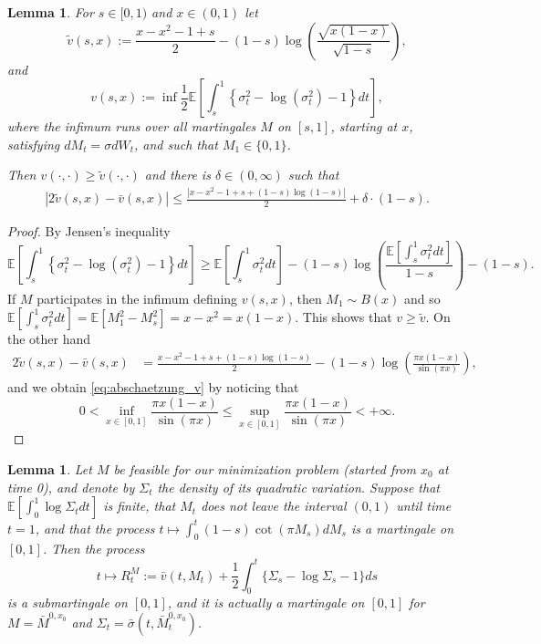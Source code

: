 \documentclass[reqno, a4paper]{amsart}
\newtheorem{lemma}[theorem]{Lemma}
\theoremstyle{remark}
\newcommand{\1}{\mathbbm 1}
\numberwithin{equation}{section}
\numberwithin{theorem}{section}
\newcommand{\mo}{\bar{M}}
\newcommand{\vo}{\bar{v}}
\newcommand{\so}{\bar{\sigma}}
\begin{document}
\begin{lemma}\label{lem:various_vs}
	For $s\in[0,1)$ and $x\in(0,1)$ let 
	\[\tilde v(s,x):= \frac{x-x^2-1+s}{2}-(1-s)\log\left(\frac{\sqrt{x(1-x)}}{\sqrt{1-s}} \right ),\]
	and
	\[v(s,x):=\inf\frac{1}{2}\mathbb E\left[\int_s^1 \left \{\sigma_t^2-  \log(\sigma_t^2) -1\right \} dt  \right ],
\]
where the infimum runs over all martingales $M$ on $[s,1]$, starting at $x$, satisfying $dM_t=\sigma dW_t$, and such that $M_1\in\{0,1\}$.

	Then $v(\cdot,\cdot)\geq \tilde v(\cdot,\cdot)$ and there is $\delta\in (0,\infty)$ such that
	\begin{align}
	\label{eq:abschaetzung_v}	
\left |2\tilde v(s,x)-\vo(s,x)\right | \leq \frac{|x-x^2-1+s+(1-s)\log(1-s)|}{2}+\delta\cdot(1-s).
	\end{align}
\end{lemma}

\begin{proof}
	By Jensen's inequality 
	\[\mathbb E\left[\int_s^1 \left \{\sigma_t^2-  \log(\sigma_t^2) -1\right \} dt  \right ]\geq \mathbb E\left[\int_s^1 \sigma_t^2 dt \right ] -  (1-s)\log\left(\frac{\mathbb E\left[\int_s^1 \sigma_t^2 dt \right ]}{1-s}\right ) - (1-s) .\]
	If $M$ participates in the infimum defining $v(s,x)$, then $M_1\sim B(x)$ and so $\mathbb E\left[\int_s^1 \sigma_t^2 dt \right ]=\mathbb E[M_1^2-M_s^2] = x -x^2=x(1-x)$. This shows that $v\geq \tilde v$. On the other hand 
	\begin{align*}
		2\tilde v(s,x)-\vo(s,x)&= \frac{x-x^2-1+s+(1-s)\log(1-s)}{2}-(1-s)\log\left (\frac{\pi x(1-x)}{\sin(\pi x)} \right ),
	\end{align*}
and we obtain \eqref{eq:abschaetzung_v} by noticing that
\[0<\inf_{x\in[0,1]}\frac{\pi x(1-x)}{\sin(\pi x)}\leq \sup_{x\in[0,1]}\frac{\pi x(1-x)}{\sin(\pi x)} <+\infty. \]
\end{proof}

\begin{lemma}\label{lem_veri}
	Let $M$ be feasible for our minimization problem (started from $x_0$ at time 0), and denote by $\Sigma_t$ the density of its quadratic variation. 
Suppose that $\mathbb E[\int_0^1\log \Sigma_t dt]$ is finite, that $M_t$ does not leave the interval $(0,1)$ until time $t=1$, and that the process $t\mapsto \int_0^t (1-s)\cot(\pi M_s)dM_s$ is a martingale on $[0,1]$. 	Then the process
	$$t\mapsto R_t^M:=\vo(t,M_t)+\frac{1}{2}\int_0^t\{\Sigma_s-\log\Sigma_s-1\}ds
$$
is a submartingale on $[0,1]$, and it is actually a martingale  on $[0,1]$ for $M=\mo^{0,x_0}$ and $\Sigma_t=\so(t,\mo^{0,x_0}_t)$.
\end{lemma}
\end{document}
